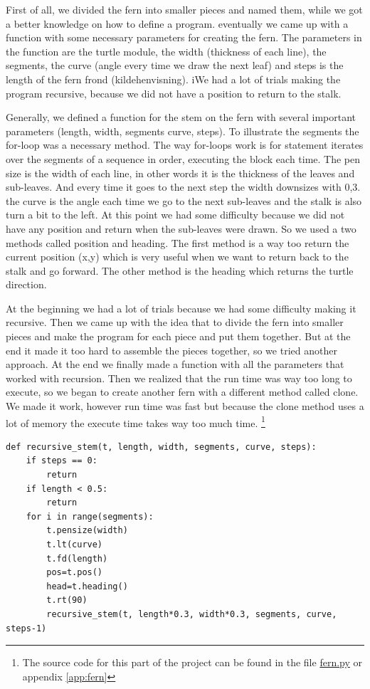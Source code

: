 \documentclass[titlepage]{article}
\begin{document}
First of all, we divided the fern into smaller pieces and named them, while we got a better knowledge on how to define a program. eventually we came up with a function with some necessary parameters for creating the fern. The parameters in the function are the turtle module, the width (thickness of each line), the segments, the curve (angle every time we draw the next leaf) and steps is the length of the fern frond (kildehenvisning). iWe had a lot of trials making the program recursive, because we did not have a position to return to the stalk.\par

Generally, we defined a function for the stem on the fern with several important parameters (length, width, segments curve, steps). To illustrate the segments the for-loop was a necessary method. The way for-loops work is for statement iterates over the segments of a sequence in order, executing the block each time. The pen size is the width of each line, in other words it is the thickness of the leaves and sub-leaves. And every time it goes to the next step the width downsizes with 0,3. the curve is the angle each time we go to the next sub-leaves and the stalk is also turn a bit to the left. At this point we had some difficulty because we did not have any position and return when the sub-leaves were drawn. So we used a two methods called position and heading. The first method is a way too return the current position (x,y) which is very useful when we want to return back to the stalk and go forward. The other method is the heading which returns the turtle direction.
\par
At the beginning we had a lot of trials because we had some difficulty making it recursive. Then we came up with the idea that to divide the fern into smaller pieces and make the program for each piece and put them together. But at the end it made it too hard to assemble the pieces together, so we tried another approach. At the end we finally made a function with all the parameters that worked with recursion. Then we realized that the run time was way too long to execute, so we began to create another fern with a different method called clone. We made it work, however run time was fast but because the clone method uses a lot of memory the execute time takes way too much time. \footnote{The source code for this part of the project can be found in the file \href{https://github.com/ErikAndersen81/DM550-FractalProject/blob/master/fern.py}{fern.py} or appendix \ref{app:fern}}


\begin{verbatim}  
def recursive_stem(t, length, width, segments, curve, steps):
    if steps == 0:
        return
    if length < 0.5:
        return
    for i in range(segments):
        t.pensize(width)
        t.lt(curve)
        t.fd(length)
        pos=t.pos()
        head=t.heading()
        t.rt(90)
        recursive_stem(t, length*0.3, width*0.3, segments, curve, steps-1)
\end{verbatim}
\end{document}
